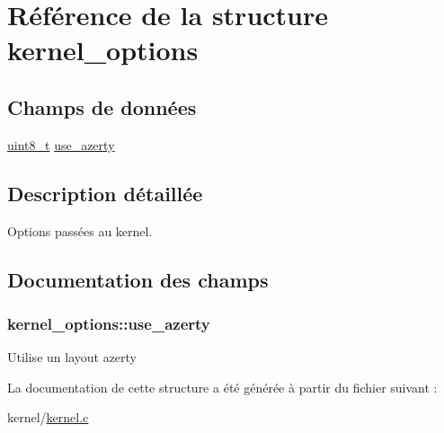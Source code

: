 \hypertarget{structkernel__options}{\section{Référence de la structure kernel\+\_\+options}
\label{structkernel__options}
}
\subsection*{Champs de données}
\begin{DoxyCompactItemize}
\item 
\hyperlink{kernel_2include_2types_8h_aba7bc1797add20fe3efdf37ced1182c5}{uint8\+\_\+t} \hyperlink{structkernel__options_aedbc4ad6aa8e903a674e32eefbdf3557}{use\+\_\+azerty}
\end{DoxyCompactItemize}


\subsection{Description détaillée}
Options passées au kernel. 

\subsection{Documentation des champs}
\hypertarget{structkernel__options_aedbc4ad6aa8e903a674e32eefbdf3557}{
\subsubsection[{use\+\_\+azerty}]{ kernel\+\_\+options\+::use\+\_\+azerty}}\label{structkernel__options_aedbc4ad6aa8e903a674e32eefbdf3557}
Utilise un layout azerty 

La documentation de cette structure a été générée à partir du fichier suivant \+:\begin{DoxyCompactItemize}
\item 
kernel/\hyperlink{kernel_8c}{kernel.\+c}\end{DoxyCompactItemize}
